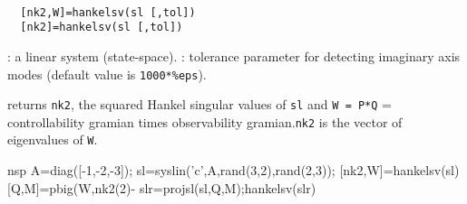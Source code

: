 \begin{mandesc}
   \\ %
\end{mandesc}
\begin{calling_sequence}
\begin{verbatim}
  [nk2,W]=hankelsv(sl [,tol])  
  [nk2]=hankelsv(sl [,tol])  
\end{verbatim}
\end{calling_sequence}
\begin{parameters}
  \begin{varlist}
    :  a linear system (state-space).
    : tolerance parameter for detecting imaginary axis modes 
    (default value is \verb!1000*%eps!).
  \end{varlist}
\end{parameters}
\begin{mandescription}
  returns \verb!nk2!, the squared Hankel singular values of \verb!sl!
  and \verb!W = P*Q! = controllability gramian times observability
  gramian.\verb!nk2! is the vector of eigenvalues of \verb!W!.
\end{mandescription}
\begin{examples}
  \begin{mintednsp}{nsp}
    A=diag([-1,-2,-3]);
    sl=syslin('c',A,rand(3,2),rand(2,3));
    [nk2,W]=hankelsv(sl)
    [Q,M]=pbig(W,nk2(2)-%
    slr=projsl(sl,Q,M);hankelsv(slr)
  \end{mintednsp}
\end{examples}
\begin{manseealso}
      
\end{manseealso}
